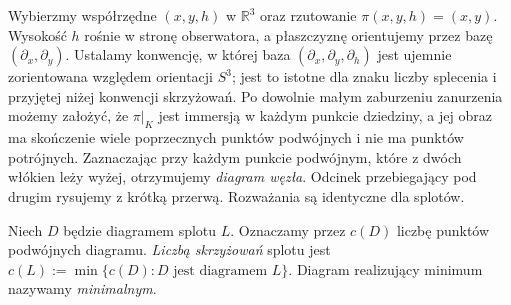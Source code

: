 Wybierzmy współrzędne $(x,y,h)$ w $\mathbb R^3$ oraz rzutowanie
$\pi(x,y,h)=(x,y)$. Wysokość $h$ rośnie w stronę obserwatora,
a płaszczyznę orientujemy przez bazę $(\partial_x,\partial_y)$.
Ustalamy konwencję, w której baza
$(\partial_x,\partial_y,\partial_h)$ jest ujemnie zorientowana
względem orientacji $S^3$; jest to istotne dla znaku liczby
splecenia i przyjętej niżej konwencji skrzyżowań.
Po dowolnie małym zaburzeniu zanurzenia możemy założyć, że $\pi|_K$
jest immersją w każdym punkcie dziedziny, a jej obraz ma
skończenie wiele poprzecznych punktów podwójnych i nie ma
punktów potrójnych.
Zaznaczając przy każdym punkcie podwójnym, które z dwóch włókien
leży wyżej, otrzymujemy \emph{diagram węzła}. Odcinek przebiegający
pod drugim rysujemy z krótką przerwą. Rozważania są identyczne dla
splotów.

\begin{center}
\end{center}

\begin{definicja}
Niech $D$ będzie diagramem splotu $L$. Oznaczamy przez $c(D)$ liczbę
punktów podwójnych diagramu. \emph{Liczbą skrzyżowań} splotu jest
$c(L):=\min\{c(D):D\text{ jest diagramem }L\}$. Diagram realizujący
minimum nazywamy \emph{minimalnym}.
\end{definicja}

